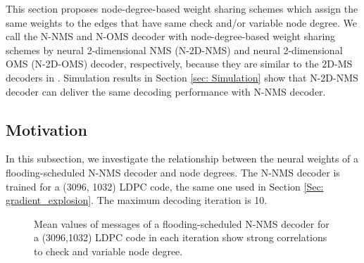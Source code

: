 \documentclass [PhD] {uclathes}
\begin{document}
This section proposes node-degree-based weight sharing schemes which assign the same weights to the edges that have same check and/or variable node degree. We call the N-NMS and N-OMS decoder with node-degree-based weight sharing schemes by neural 2-dimensional NMS (N-2D-NMS) and neural 2-dimensional OMS (N-2D-OMS) decoder, respectively,  because they are similar to the 2D-MS decoders in \cite{Juntan_Zhang2005-2dnms,2doms}. Simulation results in Section \ref{sec: Simulation} show that N-2D-NMS decoder can deliver the same decoding performance with N-NMS decoder.

\subsection{Motivation}
In this subsection, we investigate the relationship between the neural weights of a flooding-scheduled N-NMS decoder and node degrees. 
The N-NMS decoder is trained for a  (3096, 1032) LDPC code, the same one used in Section  \ref{Sec: gradient_explosion}. The maximum decoding iteration is 10.
\begin{figure}[t]
    \centering
    \hfill
  \caption{Mean values of messages of a flooding-scheduled N-NMS decoder for a (3096,1032) LDPC code in each iteration show strong correlations to check and variable node degree.}
   \label{fig: weights_evaluation}
\end{figure}
\end{document}
